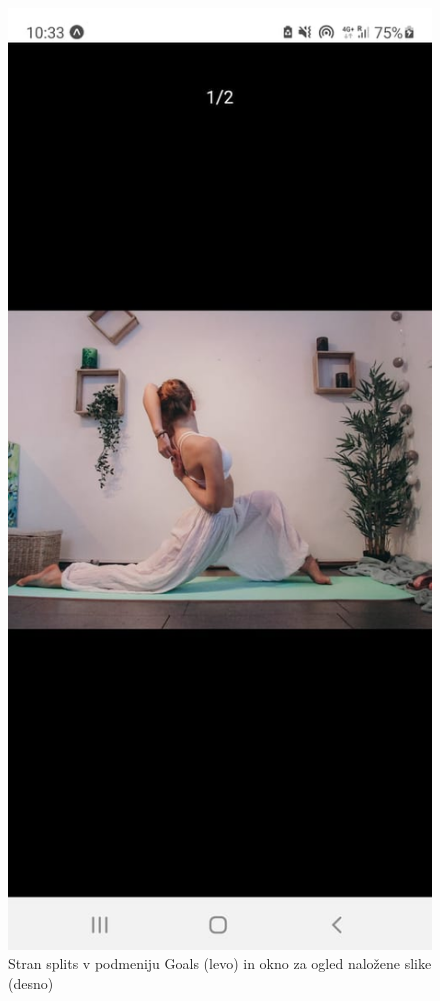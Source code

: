 \documentclass[a4paper, 12pt]{book}
\begin{document}
\begin{figure}[ht]
\begin{minipage}[b]{0.4\textwidth}
  \end{minipage}
  \begin{minipage}[b]{0.4\textwidth}
    \includegraphics[width=\textwidth]{pregledslike.jpg}\centering
  \end{minipage}
    \caption{Stran splits v podmeniju Goals (levo) in okno za ogled naložene slike (desno)}
    \label{pregled}
\end{figure}
\end{document}
